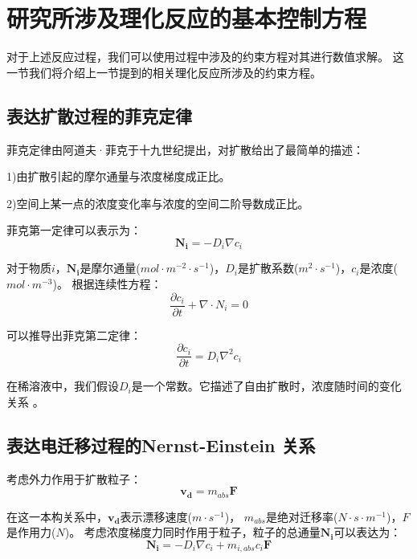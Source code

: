 \section{研究所涉及理化反应的基本控制方程}

对于上述反应过程，我们可以使用过程中涉及的约束方程对其进行数值求解。
这一节我们将介绍上一节提到的相关理化反应所涉及的约束方程。

\subsection{表达扩散过程的菲克定律}
菲克定律由阿道夫·菲克于十九世纪提出，对扩散给出了最简单的描述：

1)由扩散引起的摩尔通量与浓度梯度成正比。

2)空间上某一点的浓度变化率与浓度的空间二阶导数成正比。


菲克第一定律可以表示为：
\begin{equation}
    \mathbf{N_i}=-D_i\nabla{c_i}
\end{equation}

对于物质$i$，$\mathbf{N_i}$是摩尔通量($mol\cdot{m^{-2}\cdot{s^{-1}}}$)，$D_i$是扩散系数($m^2\cdot{s^{-1}}$)，$c_i$是浓度($mol\cdot{m^{-3}}$)。
根据连续性方程：
\begin{equation}
    \frac{\partial c_i}{\partial t}+\nabla\cdot{N_i}=0
    \label{eqation:continuity}
\end{equation}

可以推导出菲克第二定律：
\begin{equation}
    \frac{\partial c_i}{\partial t}=D_i\nabla^2{c_i}
    \label{fick's 2nd}
\end{equation}

在稀溶液中，我们假设$D_i$是一个常数。它描述了自由扩散时，浓度随时间的变化关系\cite{Sakaguchi2018} 。
\subsection{表达电迁移过程的Nernst-Einstein 关系}
考虑外力作用于扩散粒子：
\begin{equation}
    \mathbf{v_d}=m_{abs}\mathbf{F}
\end{equation}

在这一本构关系中，$\mathbf{v_d}$表示漂移速度($m\cdot{s^{-1}}$)，
$m_{abs}$是绝对迁移率($N\cdot{s\cdot{m^{-1}}}$)，$F$是作用力($N$)。
考虑浓度梯度力同时作用于粒子，粒子的总通量$\mathbf{N_i}$可以表达为：
\begin{equation}
    \mathbf{N_i}=-D_i\nabla{c_i}+m_{i,abs}c_i\mathbf{F}
\end{equation}

